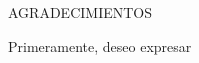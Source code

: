 \begin{center}
\textsc{\LARGE A\hspace{0.3cm}G\hspace{0.3cm}R\hspace{0.3cm}A\hspace{0.3cm}D\hspace{0.3cm}E\hspace{0.3cm}C\hspace{0.3cm}I\hspace{0.3cm}M\hspace{0.3cm}I\hspace{0.3cm}E\hspace{0.3cm}N\hspace{0.3cm}T\hspace{0.3cm}O\hspace{0.3cm}S}\\[2cm]
\end{center}

Primeramente, deseo expresar

